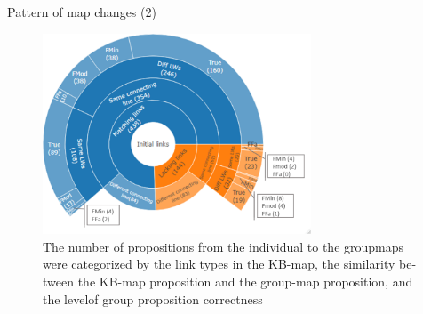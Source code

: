 \begin{frame}{Pattern of map changes (2)}
    \begin{figure}[tb]
    \begin{center}
        \includegraphics[width=80mm]{images/rqa_map_patterns_b.pdf}
    \end{center}
    \caption{The  number  of  propositions  from  the  individual  to  the  groupmaps were categorized by the link types in the KB-map, the similarity be-tween the KB-map proposition and the group-map proposition, and the levelof group proposition correctness}
    \label{a1::map_sample}
\end{figure}
\end{frame}
